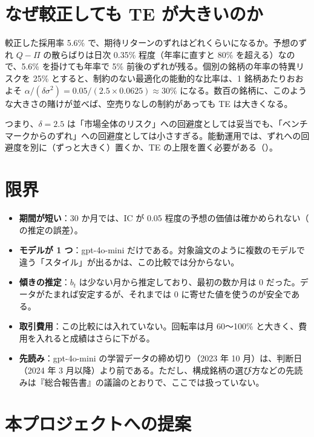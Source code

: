 \section{なぜ較正しても TE が大きいのか}

較正した採用率 5.6\% で、期待リターンのずれはどれくらいになるか。予想のずれ $Q-\Pi$ の散らばりは日次 0.35\% 程度（年率に直すと 80\% を超える）なので、5.6\% を掛けても年率で 5\% 前後のずれが残る。個別の銘柄の年率の特異リスクを 25\% とすると、制約のない最適化の能動的な比率は、1 銘柄あたりおおよそ $\alpha/(\delta\sigma^2)=0.05/(2.5\times0.0625)\approx30\%$ になる。数百の銘柄に、このような大きさの賭けが並べば、空売りなしの制約があっても TE は大きくなる。

つまり、$\delta=2.5$ は「市場全体のリスク」への回避度としては妥当でも、「ベンチマークからのずれ」への回避度としては小さすぎる。能動運用では、ずれへの回避度を別に（ずっと大きく）置くか、TE の上限を置く必要がある（）。

\section{限界}

\begin{itemize}
\item \textbf{期間が短い}：30 か月では、IC が 0.05 程度の予想の価値は確かめられない（ の推定の誤差）。
\item \textbf{モデルが 1 つ}：gpt-4o-mini だけである。対象論文のように複数のモデルで違う「スタイル」が出るかは、この比較では分からない。
\item \textbf{傾きの推定}：$b_t$ は少ない月から推定しており、最初の数か月は 0 だった。データがたまれば安定するが、それまでは 0 に寄せた値を使うのが安全である。
\item \textbf{取引費用}：この比較には入れていない。回転率は月 60〜100\% と大きく、費用を入れると成績はさらに下がる。
\item \textbf{先読み}：gpt-4o-mini の学習データの締め切り（2023 年 10 月）は、判断日（2024 年 3 月以降）より前である。ただし、構成銘柄の選び方などの先読みは『総合報告書』の議論のとおりで、ここでは扱っていない。
\end{itemize}

\section{本プロジェクトへの提案}

